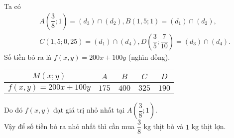 \begin{bt}
{\begin{center}
		\end{center}
		Ta có 
		{\allowdisplaybreaks
			\begin{eqnarray*}
				&&A\left(\dfrac{3}{8};1\right)=(d_3) \cap (d_2), B(1{,}5;1)=(d_1) \cap (d_2),\\
				&&C(1{,}5;0{,}25)=(d_1) \cap (d_4), D\left(\dfrac{3}{5};\dfrac{7}{10}\right)=(d_3) \cap (d_4).
			\end{eqnarray*}
		}
		Số tiền bỏ ra là $f(x,y)=200x+100y$ (nghìn đồng).
		\begin{center}
			\renewcommand\arraystretch{1.6}
			\renewcommand{\tabcolsep}{6mm}
			\begin{tabular}{|c|c|c|c|c|}
				\hline 
				$M(x;y)$& $A$ & $B$ & $C$ & $D$ \\ 
				\hline 
				$f(x,y)=200x+100y$& $175$ & $400$ & $325$ & $190$ \\ 
				\hline 
			\end{tabular} 
		\end{center}
		Do đó $f(x,y)$ đạt giá trị nhỏ nhất tại $A\left(\dfrac{3}{8};1\right)$.\\
		Vậy để số tiền bỏ ra nhỏ nhất thì cần mua $\dfrac{3}{8}$ kg thịt bò và $1$ kg thịt lợn.
	}
\end{bt}
